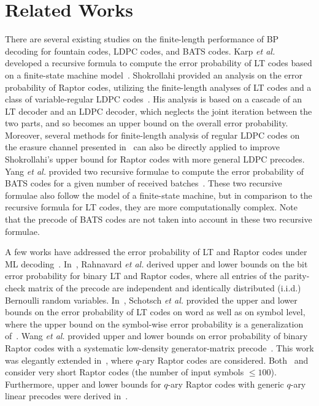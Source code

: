 \section{Related Works}
There are several existing studies on the finite-length performance of BP decoding for fountain codes, LDPC codes, and BATS codes. Karp \textit{et al.} developed a recursive formula to compute the error probability of LT codes based on a finite-state machine model~\cite{FL_analysis_LT}. Shokrollahi provided an analysis on the error probability of Raptor codes, utilizing the finite-length analyses of LT codes and a class of variable-regular LDPC codes~\cite{Raptor,shokrollahi2001finite}. His analysis is based on a cascade of an LT decoder and an LDPC decoder, which neglects the joint iteration between the two parts, and so becomes an upper bound on the overall error probability. Moreover, several methods for finite-length analysis of regular LDPC codes on the erasure channel presented in~\cite{FL_analysis_LDPC,Modern_Coding_Theory,Johnson2009finite} can also be directly applied to improve Shokrollahi's upper bound for Raptor codes with more general LDPC precodes. Yang \textit{et al.} provided two recursive formulae to compute the error probability of BATS codes for a given number of received batches~\cite{FL_analysis_BATS}. These two recursive formulae also follow the model of a finite-state machine, but in comparison to the recursive formula for LT codes, they are more computationally complex. Note that the precode of BATS codes are not taken into account in these two recursive formulae.

A few works have addressed the error probability of LT and Raptor codes under ML decoding~\cite{Rahnavard2007, Birgit2013LT, Wang2016performanceRaptorML, Zhang2017boundsRaptorQ, Lazaro2017inactivation, Lazaro2021bounds}. In~\cite{Rahnavard2007}, Rahnavard \textit{et al.} derived upper and lower bounds on the bit error probability for binary LT and Raptor codes, where all entries of the parity-check matrix of the precode are independent and identically distributed (i.i.d.) Bernoulli random variables. In~\cite{Birgit2013LT}, Schotsch \textit{et al.} provided the upper and lower bounds on the error probability of LT codes on word as well as on symbol level, where the upper bound on the symbol-wise error probability is a generalization of~\cite{Rahnavard2007}. Wang \textit{et al.} provided upper and lower bounds on error probability of binary Raptor codes with a systematic low-density
generator-matrix precode~\cite{Wang2016performanceRaptorML}. This work was elegantly extended in~\cite{Zhang2017boundsRaptorQ}, where $q$-ary Raptor codes are considered. Both~\cite{Wang2016performanceRaptorML} and~\cite{Zhang2017boundsRaptorQ} consider very short Raptor codes (the number of input symbols $\le 100$). Furthermore, upper and lower bounds for $q$-ary Raptor codes with generic $q$-ary linear precodes were derived in~\cite{Lazaro2021bounds}. 

